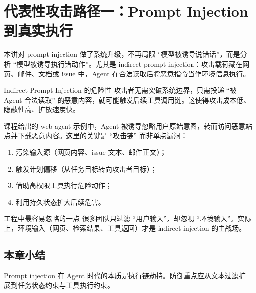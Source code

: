 \section{代表性攻击路径一：Prompt Injection 到真实执行}

本讲对 prompt injection 做了系统升级，不再局限 ``模型被诱导说错话''，而是分析 ``模型被诱导执行错动作''。尤其是 indirect prompt injection：攻击载荷藏在网页、邮件、文档或 issue 中，Agent 在合法读取后将恶意指令当作环境信息执行。

\begin{importantbox}{Indirect Prompt Injection 的危险性}
攻击者无需突破系统边界，只需投递 ``被 Agent 合法读取'' 的恶意内容，就可能触发后续工具调用链。这使得攻击成本低、隐蔽性高、扩散速度快。
\end{importantbox}

课程给出的 web agent 示例中，Agent 被诱导忽略用户原始意图，转而访问恶意站点并下载恶意内容。这里的关键是 ``攻击链'' 而非单点漏洞：
\begin{enumerate}
    \item 污染输入源（网页内容、issue 文本、邮件正文）；
    \item 触发计划偏移（从任务目标转向攻击者目标）；
    \item 借助高权限工具执行危险动作；
    \item 利用持久状态扩大后续危害。
\end{enumerate}

\begin{warningbox}{工程中最容易忽略的一点}
很多团队只过滤 ``用户输入''，却忽视 ``环境输入''。实际上，环境输入（网页、检索结果、工具返回）才是 indirect injection 的主战场。
\end{warningbox}

\subsection{本章小结}
Prompt injection 在 Agent 时代的本质是执行链劫持。防御重点应从文本过滤扩展到任务状态约束与工具执行约束。

